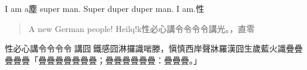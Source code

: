 \documentclass[a5paper,12pt]{article}
\newcommand*\CJKmovesymbol[1]{\raise0.0em\hbox{#1}}
\newcommand*\CJKvert{
\let\CJKpunctsymbol\CJKmovesymbol
}
\begin{document}
I am a塵 super man. Super duper duper man. I am.性
\begin{quote}
A new German people! Heilq!k性必心講令令令令講光。，直零
\end{quote}

\begin{rotate}{-90}
\begin{minipage}{15em}
\CJKvert
性必心講令令令令𠆭講囧𠞉鐵感囧淋攞識啱滕，愼慎西岸聲牀羅漢囧生歲藍火識疊疊疊疊疊「疊疊疊疊疊疊疊；疊疊疊疊疊疊：疊疊疊。」
%
\end{minipage}
\end{rotate}
\end{document}
